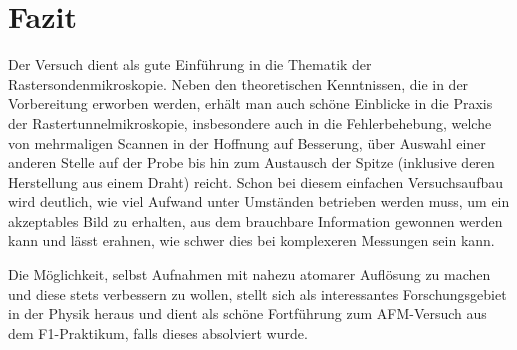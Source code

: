 \chapter{Fazit}
Der Versuch dient als gute Einführung in die Thematik der Rastersondenmikroskopie. Neben den theoretischen Kenntnissen, die in der Vorbereitung erworben werden, erhält man auch schöne Einblicke in die Praxis der Rastertunnelmikroskopie, insbesondere auch in die Fehlerbehebung, welche von mehrmaligen Scannen in der Hoffnung auf Besserung, über Auswahl einer anderen Stelle auf der Probe bis hin zum Austausch der Spitze (inklusive deren Herstellung aus einem Draht) reicht. Schon bei diesem einfachen Versuchsaufbau wird deutlich, wie viel Aufwand unter Umständen betrieben werden muss, um ein akzeptables Bild zu erhalten, aus dem brauchbare Information gewonnen werden kann und lässt erahnen, wie schwer dies bei komplexeren Messungen sein kann.

Die Möglichkeit, selbst Aufnahmen mit nahezu atomarer Auflösung zu machen und diese stets verbessern zu wollen, stellt sich als interessantes Forschungsgebiet in der Physik heraus und dient als schöne Fortführung zum AFM-Versuch aus dem F1-Praktikum, falls dieses absolviert wurde.


